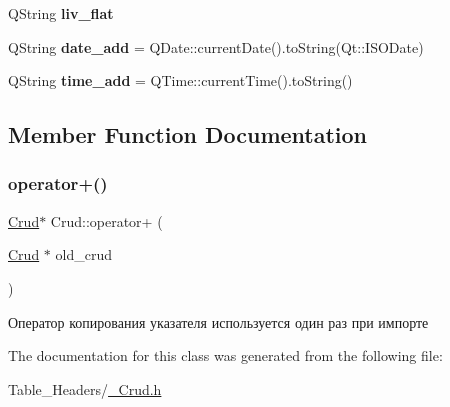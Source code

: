 \begin{DoxyCompactItemize}
\item 
\mbox{\label{class_crud_abea0ee1bc13a91b5b672390a8cba4303}} 
Q\+String {\bfseries liv\+\_\+flat}
\item 
\mbox{\label{class_crud_a8233090d3003171d44b0942db8f81c38}} 
Q\+String {\bfseries date\+\_\+add} = Q\+Date\+::current\+Date().to\+String(Qt\+::\+I\+S\+O\+Date)
\item 
\mbox{\label{class_crud_ad7b9a471d27694d07a59530c34dac864}} 
Q\+String {\bfseries time\+\_\+add} = Q\+Time\+::current\+Time().to\+String()
\end{DoxyCompactItemize}


\subsection{Member Function Documentation}
\mbox{\label{class_crud_a51806494ff098d94e1a8c553cadda0c6}} 
\subsubsection{\texorpdfstring{operator+()}{operator+()}}
{\footnotesize\ttfamily \mbox{\hyperlink{class_crud}{Crud}}$\ast$ Crud\+::operator+ (\begin{DoxyParamCaption}\item[{\mbox{\hyperlink{class_crud}{Crud}} $\ast$}]{old\+\_\+crud }\end{DoxyParamCaption})}

Оператор копирования указателя используется один раз при импорте 

The documentation for this class was generated from the following file\+:\begin{DoxyCompactItemize}
\item 
Table\+\_\+\+Headers/\mbox{\hyperlink{___crud_8h}{\+\_\+\+Crud.\+h}}\end{DoxyCompactItemize}
